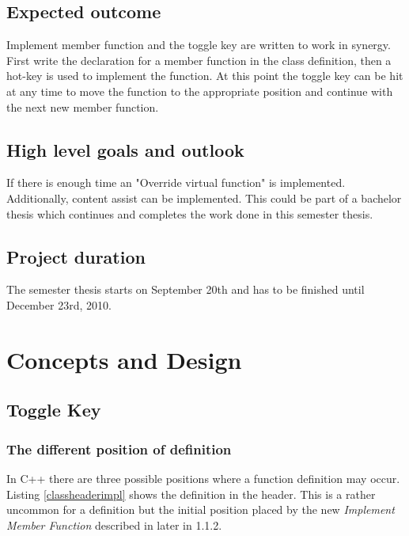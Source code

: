 \documentclass[a4paper,12pt,abstract=on]{scrreprt}
\begin{document}
\section{Expected outcome}

Implement member function and the toggle key are written to work in synergy.
First write the declaration for a member function in the class definition, then
a hot-key is used to implement the function. At this point the toggle key can
be hit at any time to move the function to the appropriate position and
continue with the next new member function.

\section{High level goals and outlook}

If there is enough time an "Override virtual function" is implemented.
Additionally, content assist can be implemented. This could be part of a
bachelor thesis which continues and completes the work done in this semester
thesis.

\section{Project duration}
The semester thesis starts on September 20th and has to be finished until
December 23rd, 2010.

\chapter{Concepts and Design}
\thispagestyle{fancy}

\section{Toggle Key}

\subsection{The different position of definition}

In C++ there are three possible positions where a  function definition may occur. Listing \ref{classheaderimpl} shows
the definition in the header. This is a rather uncommon for a definition but the
initial position placed by the new \textit{Implement Member Function} described
in later in 1.1.2.

\end{document}
